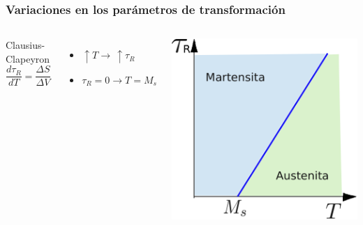 \documentclass[usenames,dvipsnames]{beamer}
\begin{document}
\begin{frame}
\frametitle{Variaciones en los parámetros de transformación}

\begin{columns}

\begin{block}{Clausius-Clapeyron}
\begin{equation*}
 \frac{d \tau_{R}}{dT}=\frac{\Delta S}{\Delta V} 
\end{equation*}
\end{block}

\begin{itemize}
 \item $\uparrow T \rightarrow \, \uparrow \tau_{R}$
 \item $\tau_{R} = 0  \rightarrow T=M_{s}$
\end{itemize}

\includegraphics[width=\columnwidth]{img/intro/Clapeyron.eps}

\end{columns}


\end{frame}
\end{document}
